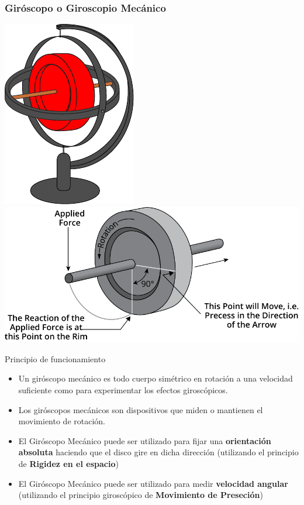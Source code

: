\begin{frame}
    \frametitle{Giróscopo o Giroscopio Mecánico}
    \scriptsize
    \begin{center}
        \hspace{1em}
        \includegraphics[width=0.15\columnwidth]{images/gyroscope.pdf}
        \hspace{1em}
        \includegraphics[width=0.4\columnwidth]{images/gyroscope_precession.pdf}
    \end{center}

    \begin{block}{Principio de funcionamiento}
        \begin{itemize}
            \item Un giróscopo mecánico es todo cuerpo simétrico en rotación a una velocidad suficiente como para experimentar los efectos giroscópicos.
            \item Los giróscopos mecánicos son dispositivos que miden o mantienen el movimiento de rotación.
            \item El Giróscopo Mecánico puede ser utilizado para fijar una \textbf{orientación absoluta} haciendo que el disco gire en dicha dirección (utilizando el principio de \textbf{Rigidez en el espacio})
            \item El Giróscopo Mecánico puede ser utilizado para medir \textbf{velocidad angular} (utilizando el principio giroscópico de \textbf{Movimiento de Preseción})
        \end{itemize}
    \end{block}
    


\end{frame}

